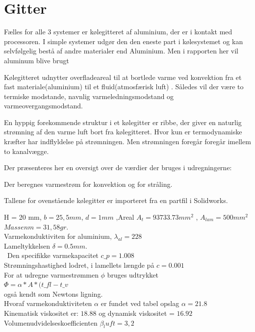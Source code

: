 \section{Gitter}

Fælles for alle 3 systemer er kølegitteret af aluminium, der er i kontakt med processoren. 
I simple systemer udgør den den eneste part i kølesystemet og kan selvfølgelig bestå af andre materialer end Aluminium. 
Men i rapporten her vil aluminum blive brugt

Kølegitteret udnytter overfladeareal til at bortlede varme ved konvektion fra et fast materiale(aluminium) til et fluid(atmosfærisk luft) .
Således vil der være to termiske modstande, navnlig varmeledningsmodstand og varmeovergangsmodstand.

En hyppig forekommende struktur i et kølegitter er ribbe, der giver en naturlig strømning af den varme luft bort fra kølegitteret. Hvor kun er termodynamiske kræfter har indflyldelse på strømningen. Men strømningen foregår foregår imellem to kanalvægge. 

Der præsenteres her en oversigt over de værdier der bruges i udregningerne: 

Der beregnes varmestrøm for konvektion og for stråling.

Tallene for ovenstående kølegitter er importeret fra en partfil i Solidworks. %

H = 20 mm, $b = 25,5 mm$, $d  =1 mm$ ,Areal $A_t = 93733.73 mm^2$ , $A_{lam}= 500 mm^2$  \\ 
$ Massen m = 31,58 gr.$ \\
Varmekonduktiviten for aluminium, $\lambda_{al} = 228$ \\  
Lameltykkelsen $\delta = 0.5 mm.$  \\\
Den specifikke varmekapacitet $c\_p = 1.008$ \\
Strømningshastighed lodret, i lamellets længde på $c = 0.001$ \\



For at udregne varmestrømmen $\phi$  bruges udtrykket \\ $\Phi = \alpha * A* (t\_{fl}-t\_v$ \\  også kendt som Newtons ligning. \\ 
Hvoraf varmekonduktiviteten $\alpha$ er fundet ved tabel opslag $\alpha = 21.8$ \\
Kinematisk viskositet er: $18.88$ og dynamisk viskositet = $16.92$  \\
Volumenudvidelseskoefficienten $\beta_luft = 3,2$ \\
 
